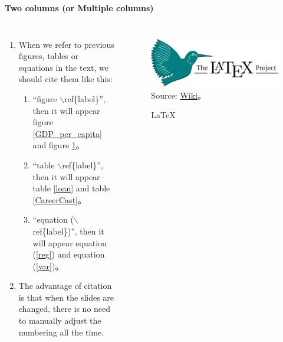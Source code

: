 \documentclass[12pt, aspectratio=169]{beamer}
\begin{document}

\linespread{1}
\begin{frame}{\textbf{Two columns (or Multiple columns)}}
\linespread{1.5}

	\begin{columns}[c] %
			\begin{enumerate}[]
				\item When we refer to previous figures, tables or equations in the text, we should cite them like this:
				\begin{enumerate}[]
					\item ``figure $\backslash$ref\{label\}'', 
						then it will appear figure \ref{GDP_per_capita} and figure \ref{LaTeX}。
					\item ``table $\backslash$ref\{label\}'',
						then it will appear table \ref{loan} and table \ref{CareerCast}。
					\item ``equation ($\backslash$ref\{label\})'',
						then it will appear equation (\ref{reg}) and equation (\ref{var})。
				\end{enumerate}
				\item The advantage of citation is that when the slides are changed, there is no need to manually adjust the numbering all the time.
			\end{enumerate}

			\begin{figure}
				\includegraphics[scale=0.03]{Fig/LaTeX.png}\\
				\scriptsize{Source:
				\href{https://en.wikipedia.org/wiki/LaTeX}{Wiki}。}\\
				\caption{\LaTeX}
				\label{LaTeX} 
			\end{figure}
	\end{columns}
\end{frame}
\end{document}

